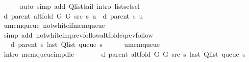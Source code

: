 \begin{isabellebody}
\ \ \ \ \isamarkupfalse%
\ {\isacharparenleft}{\kern0pt}auto\ simp\ add{\isacharcolon}{\kern0pt}\ Q{\isachardot}{\kern0pt}list{\isacharunderscore}{\kern0pt}tail\ intro{\isacharcolon}{\kern0pt}\ list{\isachardot}{\kern0pt}set{\isacharunderscore}{\kern0pt}sel{\isacharparenleft}{\kern0pt}{}{\isacharparenright}{\kern0pt}{\isacharparenright}{\kern0pt}\isanewline
\ \ \isamarkupfalse%
\ {\isachardoublequoteopen}d\ {\isacharparenleft}{\kern0pt}parent\ {\isacharparenleft}{\kern0pt}alt{\isacharunderscore}{\kern0pt}fold\ G{}\ G{}\ src\ s{\isacharparenright}{\kern0pt}{\isacharparenright}{\kern0pt}\ u\ {\isacharequal}{\kern0pt}\ d\ {\isacharparenleft}{\kern0pt}parent\ s{\isacharparenright}{\kern0pt}\ u{\isachardoublequoteclose}\isanewline
\ \ \ \ \isamarkupfalse%
\ u{\isacharunderscore}{\kern0pt}mem{\isacharunderscore}{\kern0pt}queue\ not{\isacharunderscore}{\kern0pt}white{\isacharunderscore}{\kern0pt}if{\isacharunderscore}{\kern0pt}mem{\isacharunderscore}{\kern0pt}queue\isanewline
\ \ \ \ \isamarkupfalse%
\ {\isacharparenleft}{\kern0pt}simp\ add{\isacharcolon}{\kern0pt}\ not{\isacharunderscore}{\kern0pt}white{\isacharunderscore}{\kern0pt}imp{\isacharunderscore}{\kern0pt}rev{\isacharunderscore}{\kern0pt}follow{\isacharunderscore}{\kern0pt}alt{\isacharunderscore}{\kern0pt}fold{\isacharunderscore}{\kern0pt}eq{\isacharunderscore}{\kern0pt}rev{\isacharunderscore}{\kern0pt}follow{\isacharparenright}{\kern0pt}\isanewline
\ \ \isamarkupfalse%
\ \isamarkupfalse%
\ {\isachardoublequoteopen}{\isachardot}{\kern0pt}{\isachardot}{\kern0pt}{\isachardot}{\kern0pt}\ {\isasymle}\ d\ {\isacharparenleft}{\kern0pt}parent\ s{\isacharparenright}{\kern0pt}\ {\isacharparenleft}{\kern0pt}last\ {\isacharparenleft}{\kern0pt}Q{\isacharunderscore}{\kern0pt}list\ {\isacharparenleft}{\kern0pt}queue\ s{\isacharparenright}{\kern0pt}{\isacharparenright}{\kern0pt}{\isacharparenright}{\kern0pt}{\isachardoublequoteclose}\isanewline
\ \ \ \ \isamarkupfalse%
\ u{\isacharunderscore}{\kern0pt}mem{\isacharunderscore}{\kern0pt}queue\isanewline
\ \ \ \ \isamarkupfalse%
\ {\isacharparenleft}{\kern0pt}intro\ mem{\isacharunderscore}{\kern0pt}queue{\isacharunderscore}{\kern0pt}imp{\isacharunderscore}{\kern0pt}d{\isacharunderscore}{\kern0pt}le{\isacharparenright}{\kern0pt}\isanewline
\ \ \isamarkupfalse%
\ \isamarkupfalse%
\ {\isachardoublequoteopen}{\isachardot}{\kern0pt}{\isachardot}{\kern0pt}{\isachardot}{\kern0pt}\ {\isacharequal}{\kern0pt}\ d\ {\isacharparenleft}{\kern0pt}parent\ {\isacharparenleft}{\kern0pt}alt{\isacharunderscore}{\kern0pt}fold\ G{}\ G{}\ src\ s{\isacharparenright}{\kern0pt}{\isacharparenright}{\kern0pt}\ {\isacharparenleft}{\kern0pt}last\ {\isacharparenleft}{\kern0pt}Q{\isacharunderscore}{\kern0pt}list\ {\isacharparenleft}{\kern0pt}queue\ s{\isacharparenright}{\kern0pt}{\isacharparenright}{\kern0pt}{\isacharparenright}{\kern0pt}{\isachardoublequoteclose}\isanewline

\end{isabellebody}

